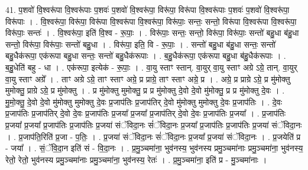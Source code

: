 \documentclass[17pt]{extarticle}
\begin{document}
41. प॒शवो॑ वि॒श्वरू॑पा वि॒श्वरू॑पाः प॒शवः॑ प॒शवो॑ वि॒श्वरू॑पा॒ विरू॑पा॒ विरू॑पा वि॒श्वरू॑पाः प॒शवः॑ प॒शवो॑ वि॒श्वरू॑पा॒ विरू॑पाः । . वि॒श्वरू॑पा॒ विरू॑पा॒ विरू॑पा वि॒श्वरू॑पा वि॒श्वरू॑पा॒ विरू॑पाः॒ सन्तः॒ सन्तो॒ विरू॑पा वि॒श्वरू॑पा वि॒श्वरू॑पा॒ विरू॑पाः॒ सन्तः॑ । . वि॒श्वरू॑पा॒ इति॑ वि॒श्व - रू॒पाः॒ । . विरू॑पाः॒ सन्तः॒ सन्तो॒ विरू॑पा॒ विरू॑पाः॒ सन्तो॑ बहु॒धा ब॑हु॒धा सन्तो॒ विरू॑पा॒ विरू॑पाः॒ सन्तो॑ बहु॒धा । . विरू॑पा॒ इति॒ वि - रू॒पाः॒ । . सन्तो॑ बहु॒धा ब॑हु॒धा सन्तः॒ सन्तो॑ बहु॒धैक॑रूपा॒ एक॑रूपा बहु॒धा सन्तः॒ सन्तो॑ बहु॒धैक॑रूपाः । . ब॒हु॒धैक॑रूपा॒ एक॑रूपा बहु॒धा ब॑हु॒धैक॑रूपाः । . ब॒हु॒धेति॑ बहु - धा । . एक॑रूपा॒ इत्येक॑ - रू॒पाः॒ । . वा॒यु स्ताꣳ स्तान्. वा॒युर् वा॒यु स्ताꣳ अग्रे ऽग्रे॒ तान्. वा॒युर् वा॒यु स्ताꣳ अग्रे᳚ । . ताꣳ अग्रे ऽग्रे॒ ताꣳ स्ताꣳ अग्रे॒ प्र प्राग्रे॒ ताꣳ स्ताꣳ अग्रे॒ प्र । . अग्रे॒ प्र प्राग्रे ऽग्रे॒ प्र मु॑मोक्तु मुमोक्तु॒ प्राग्रे ऽग्रे॒ प्र मु॑मोक्तु । . प्र मु॑मोक्तु मुमोक्तु॒ प्र प्र मु॑मोक्तु दे॒वो दे॒वो मु॑मोक्तु॒ प्र प्र मु॑मोक्तु दे॒वः । . मु॒मो॒क्तु॒ दे॒वो दे॒वो मु॑मोक्तु मुमोक्तु दे॒वः प्र॒जाप॑तिः प्र॒जाप॑तिर् दे॒वो मु॑मोक्तु मुमोक्तु दे॒वः प्र॒जाप॑तिः । . दे॒वः प्र॒जाप॑तिः प्र॒जाप॑तिर् दे॒वो दे॒वः प्र॒जाप॑तिः प्र॒जया᳚ प्र॒जया᳚ प्र॒जाप॑तिर् दे॒वो दे॒वः प्र॒जाप॑तिः प्र॒जया᳚ । . प्र॒जाप॑तिः प्र॒जया᳚ प्र॒जया᳚ प्र॒जाप॑तिः प्र॒जाप॑तिः प्र॒जया॑ संॅविदा॒नः सं॑ॅविदा॒नः प्र॒जया᳚ प्र॒जाप॑तिः प्र॒जाप॑तिः प्र॒जया॑ संॅविदा॒नः । . प्र॒जाप॑ति॒रिति॑ प्र॒जा - प॒तिः॒ । . प्र॒जया॑ संॅविदा॒नः सं॑ॅविदा॒नः प्र॒जया᳚ प्र॒जया॑ संॅविदा॒नः । . प्र॒जयेति॑ प्र - जया᳚ । . सं॒ॅवि॒दा॒न इति॑ सं - वि॒दा॒नः । . प्र॒मु॒ञ्चमा॑ना॒ भुव॑नस्य॒ भुव॑नस्य प्रमु॒ञ्चमा॑नाः प्रमु॒ञ्चमा॑ना॒ भुव॑नस्य॒ रेतो॒ रेतो॒ भुव॑नस्य प्रमु॒ञ्चमा॑नाः प्रमु॒ञ्चमा॑ना॒ भुव॑नस्य॒ रेतः॑ । . प्र॒मु॒ञ्चमा॑ना॒ इति॑ प्र - मु॒ञ्चमा॑नाः । \newline
\pagebreak
{}
\end{document}
